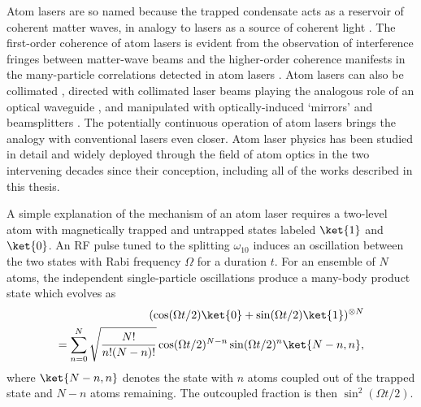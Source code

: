 	Atom lasers are so named because the trapped condensate acts as a reservoir of coherent matter waves, in analogy to lasers as a source of coherent light \cite{Naraschewski99,Glauber63}.
	The first-order coherence of atom lasers is evident from the observation of interference fringes between matter-wave beams \cite{Andrews97} and the higher-order coherence manifests in the many-particle correlations detected in \mhe atom lasers \cite{Manning10,Dall11a,Rugway11}.
	Atom lasers can also be collimated \cite{Bloch99}, directed with collimated laser beams playing the analogous role of an optical waveguide \cite{Guerin06,Couvert08}, and manipulated with optically-induced `mirrors' and beamsplitters \cite{Bloch01}.
	The potentially continuous operation of atom lasers \cite{Chikkatur02} brings the analogy with conventional lasers even closer.
	Atom laser physics has been studied in detail and widely deployed through the field of atom optics in the two intervening decades since their conception, including all of the works described in this thesis.
	


	A simple explanation of the mechanism of an atom laser requires a two-level atom with magnetically trapped and untrapped states labeled $\ket{1}$ and $\ket{0}$.
	An RF pulse tuned to the splitting $\omega_{10}$ induces an oscillation between the two states with Rabi frequency $\Omega$ for a duration $t$.
	For an ensemble of $N$ atoms, the independent single-particle oscillations produce a many-body product state which evolves as \cite{Mewes97}
	\begin{align}
		(\cos(\Omega t/2)\ket{0} + \sin(\Omega t/2)\ket{1})^{\otimes N} \\
		= \sum_{n=0}^{ N}\sqrt{\frac{N!}{n!(N-n)!}}\cos(\Omega t/2)^{N-n}\sin(\Omega t/2)^n\ket{N-n,n},
		\label{eqn:PAL_Rabi}
	\end{align}
	where $\ket{N-n,n}$ denotes the state with $n$ atoms coupled out of the trapped state and $N-n$ atoms remaining.
	The outcoupled fraction is then $\sin^2(\Omega t/2)$.

